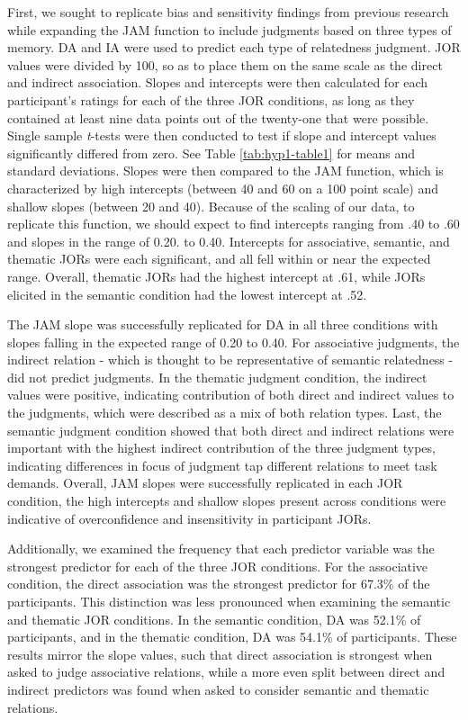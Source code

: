 \documentclass[english,,man]{apa6}
\begin{document}
First, we sought to replicate bias and sensitivity findings from previous research while expanding the JAM function to include judgments based on three types of memory. DA and IA were used to predict each type of relatedness judgment. JOR values were divided by 100, so as to place them on the same scale as the direct and indirect association. Slopes and intercepts were then calculated for each participant's ratings for each of the three JOR conditions, as long as they contained at least nine data points out of the twenty-one that were possible. Single sample \emph{t}-tests were then conducted to test if slope and intercept values significantly differed from zero. See Table \ref{tab:hyp1-table1} for means and standard deviations. Slopes were then compared to the JAM function, which is characterized by high intercepts (between 40 and 60 on a 100 point scale) and shallow slopes (between 20 and 40). Because of the scaling of our data, to replicate this function, we should expect to find intercepts ranging from .40 to .60 and slopes in the range of 0.20. to 0.40. Intercepts for associative, semantic, and thematic JORs were each significant, and all fell within or near the expected range. Overall, thematic JORs had the highest intercept at .61, while JORs elicited in the semantic condition had the lowest intercept at .52.

The JAM slope was successfully replicated for DA in all three conditions with slopes falling in the expected range of 0.20 to 0.40. For associative judgments, the indirect relation - which is thought to be representative of semantic relatedness - did not predict judgments. In the thematic judgment condition, the indirect values were positive, indicating contribution of both direct and indirect values to the judgments, which were described as a mix of both relation types. Last, the semantic judgment condition showed that both direct and indirect relations were important with the highest indirect contribution of the three judgment types, indicating differences in focus of judgment tap different relations to meet task demands. Overall, JAM slopes were successfully replicated in each JOR condition, the high intercepts and shallow slopes present across conditions were indicative of overconfidence and insensitivity in participant JORs.

Additionally, we examined the frequency that each predictor variable was the strongest predictor for each of the three JOR conditions. For the associative condition, the direct association was the strongest predictor for 67.3\% of the participants. This distinction was less pronounced when examining the semantic and thematic JOR conditions. In the semantic condition, DA was 52.1\% of participants, and in the thematic condition, DA was 54.1\% of participants. These results mirror the slope values, such that direct association is strongest when asked to judge associative relations, while a more even split between direct and indirect predictors was found when asked to consider semantic and thematic relations.
\end{document}
